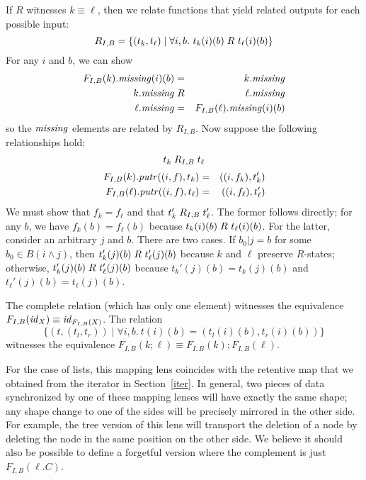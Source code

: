 \begin{defn}[$R$-similarity]
\begin{theorem}
\begin{lemma}
\begin{theorem}[No products]
\begin{lemma}
\begin{defn}
\begin{theorem}
\begin{corollary}[Hylomorphism]
\begin{defn}
\begin{lenseqv}
If $R$ witnesses $k \equiv \ell$, then we relate functions that yield
related outputs for each possible input:
\[R_{I,B} = \{(t_k,t_\ell) \mid \forall i,b.\ t_k(i)(b) \mathrel{R_{}} t_\ell(i)(b)\}\]
For any $i$ and $b$, we can show
\begin{eqnarray*}
F_{I,B}(k).\mathit{missing}(i)(b) &=& k.\mathit{missing} \\
k.\mathit{missing} &\mathrel{R_{}}& \ell.\mathit{missing} \\
\ell.\mathit{missing} &=& F_{I,B}(\ell).\mathit{missing}(i)(b)
\end{eqnarray*}
so the $\mathit{missing}$ elements are related by $R_{I,B}$. Now suppose the
following relationships hold:
\[t_k \mathrel{R_{I,B}} t_\ell\]
\vspace{-4ex} %
\begin{eqnarray*}
    F_{I,B}(k).\mathit{putr}((i,f),t_k) &=& ((i,f_k),t_k') \\
    F_{I,B}(\ell).\mathit{putr}((i,f),t_\ell) &=& ((i,f_\ell),t_\ell')
\end{eqnarray*}
We must show that $f_k = f_\ell$ and that $t_k'\mathrel{R_{I,B}}t_\ell'$.
The former follows directly; for any $b$, we have $f_k(b)=f_\ell(b)$ because
$t_k(i)(b) \mathrel{R_{}} t_\ell(i)(b)$. For the latter, consider an arbitrary $j$
and $b$. There are two cases. If $b_0|j = b$ for some $b_0 \in B(i \wedge
j)$, then $t_k'(j)(b) \mathrel{R_{}} t_\ell'(j)(b)$ because $k$ and $\ell$ preserve
$R$-states; otherwise, $t_k'(j)(b) \mathrel{R_{}} t_\ell'(j)(b)$ because
$t_k'(j)(b)=t_k(j)(b)$ and $t_\ell'(j)(b)=t_\ell(j)(b)$.
\end{lenseqv}

\begin{functoriality}
The complete relation (which has only one element) witnesses the equivalence
$F_{I,B}(\mathit{id}_X)\equiv\mathit{id}_{F_{I,B}(X)}$. The relation
\[\{(t,(t_l,t_r))\mid\forall i,b.\ t(i)(b)=(t_l(i)(b),t_r(i)(b))\}\]
witnesses the equivalence $F_{I,B}(k;\ell) \equiv F_{I,B}(k);F_{I,B}(\ell)$.
\end{functoriality}
\fi

For the case of lists, this mapping lens coincides with the retentive map
that we obtained from the iterator in Section~\ref{iter}.
%
In general, two pieces of data synchronized by one of these mapping lenses
will have exactly the same shape; any shape change to one of the sides will
be precisely mirrored in the other side.
%
For example, the tree version of this lens will transport the deletion of a
node by deleting the node in the same position on the other side.
%
We believe it should also be possible to define a forgetful version where the
complement is just $F_{I,B}(\ell.C)$.


\end{defn}
\end{corollary}
\end{theorem}
\end{defn}
\end{lemma}
\end{theorem}
\end{lemma}
\end{theorem}
\end{defn}
